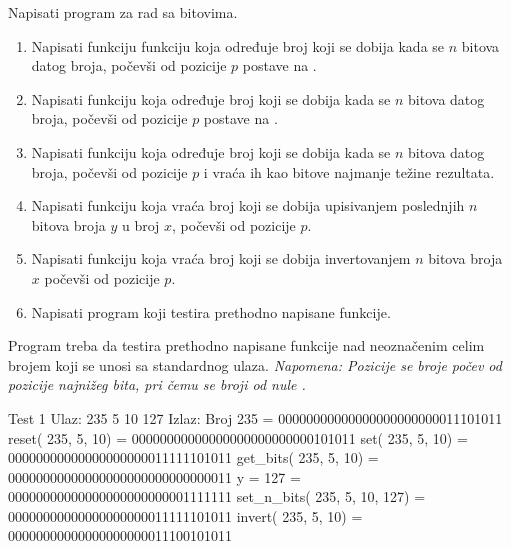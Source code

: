 \begin{Exercise}[label=004]
\begin{Exercise}[label=204]
Napisati program za rad sa bitovima.
\begin{enumerate}
\item Napisati funkciju funkciju koja određuje broj koji se dobija kada se $n$ bitova datog broja, počevši od pozicije $p$ postave na .
\item Napisati funkciju koja određuje broj koji se dobija kada se $n$ bitova datog broja, počevši od pozicije $p$ postave na .
\item Napisati funkciju koja određuje broj koji se dobija kada se $n$ bitova datog broja, počevši od pozicije $p$ i vraća ih kao bitove najmanje težine rezultata.
\item Napisati funkciju koja vraća broj koji se dobija upisivanjem poslednjih $n$ bitova broja $y$ u broj $x$, počevši od pozicije $p$.
\item Napisati funkciju koja vraća broj koji se dobija invertovanjem $n$ bitova broja $x$ počevši od pozicije $p$.
\item Napisati program koji testira prethodno napisane funkcije.
\end{enumerate}
Program treba da testira prethodno napisane funkcije nad neoznačenim celim brojem koji se unosi sa standardnog ulaza.
\emph{Napomena: Pozicije se broje počev od pozicije najnižeg bita, pri čemu se broji od nule .}

\begin{maxitest}
\begin{test}{Test 1}
Ulaz:   235 5 10 127  
Izlaz:  
  Broj   235                          = 00000000000000000000000011101011
  reset(  235,    5,   10)            = 00000000000000000000000000101011
  set(  235,    5,   10)              = 00000000000000000000011111101011
  get_bits(  235,    5,   10)         = 00000000000000000000000000000011
  y =                             127 = 00000000000000000000000001111111
  set_n_bits(  235,    5,   10,  127) = 00000000000000000000011111101011
  invert(  235,    5,   10)           = 00000000000000000000011100101011
\end{test}
\end{maxitest}

\end{Exercise}
\begin{Answer}[ref=204]
\end{Answer}



\end{Exercise}
